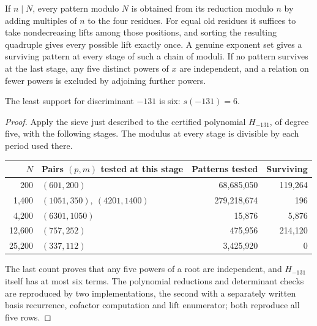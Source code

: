 If $n\mid N$, every pattern modulo $N$ is obtained from its reduction modulo $n$ by adding
multiples of $n$ to the four residues. For equal old residues it suffices to take
nondecreasing lifts among those positions, and sorting the resulting quadruple gives every
possible lift exactly once. A genuine exponent set gives a surviving pattern at every
stage of such a chain of moduli. If no pattern survives at the last stage, any five
distinct powers of $x$ are independent, and a relation on fewer powers is excluded by
adjoining further powers.

\begin{theorem}[\stU]\label{smd:thm:131}
The least support for discriminant $-131$ is six: $s(-131)=6$.
\end{theorem}

\begin{proof}
Apply the sieve just described to the certified polynomial $H_{-131}$, of degree five,
with the following stages. The modulus at every stage is divisible by each period used
there.
\begin{center}
\begin{tabular}{rlrr}
\toprule
$N$ & Pairs $(p,m)$ tested at this stage & Patterns tested & Surviving\\
\midrule
200    & $(601,200)$                    &68,685,050 &119,264\\
1,400  & $(1051,350),\ (4201,1400)$      &279,218,674&196\\
4,200  & $(6301,1050)$                  &15,876     &5,876\\
12,600 & $(757,252)$                    &475,956    &214,120\\
25,200 & $(337,112)$                    &3,425,920  &0\\
\bottomrule
\end{tabular}
\end{center}
The last count proves that any five powers of a root are independent, and $H_{-131}$
itself has at most six terms. The polynomial reductions and determinant checks are
reproduced by two implementations, the second with a separately written basis recurrence,
cofactor computation and lift enumerator; both reproduce all five rows.
\end{proof}


